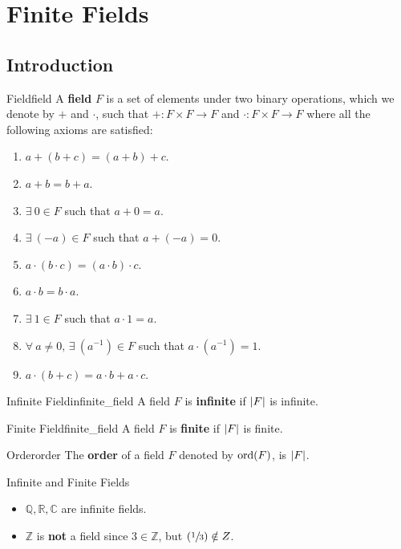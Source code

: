\chapter{Finite Fields}

\section{Introduction}
\begin{Definition}{Field}{field}
    A \textbf{field} $ F $ is a set of elements under two binary operations,
    which we denote by $ + $ and $ \cdot $, such that
    $ {+\colon F\times F\to F} $ and $ {\cdot\colon F\times F\to F} $
    where all the following axioms are satisfied:
    \begin{enumerate}[label=V\arabic*]
        \item $ a+(b+c)=(a+b)+c $.
        \item $ a+b=b+a $.
        \item $ \exists\ 0\in F $ such that $ a+0=a $.
        \item $ \exists\ (-a)\in F $ such that $ a+(-a)=0 $.
        \item $ a\cdot (b\cdot c)=(a\cdot b)\cdot c $.
        \item $ a\cdot b=b\cdot a $.
        \item $ \exists\ 1\in F $ such that $ a\cdot 1=a $.
        \item $ \forall\ a\neq 0,\,\exists\ (a^{-1})\in F $ such that
              $ a\cdot (a^{-1})=1 $.
        \item $ a\cdot (b+c)=a\cdot b+a\cdot c $.
    \end{enumerate}
\end{Definition}

\begin{Definition}{Infinite Field}{infinite_field}
    A field $ F $ is \textbf{infinite} if $ \lvert F\rvert $ is infinite.
\end{Definition}

\begin{Definition}{Finite Field}{finite_field}
    A field $ F $ is \textbf{finite} if $ \lvert F\rvert $ is finite.
\end{Definition}

\begin{Definition}{Order}{order}
    The \textbf{order} of a field $ F $ denoted by $ \operatorname{ord}(F) $, is $ \lvert F\rvert $.
\end{Definition}

\begin{Example}{Infinite and Finite Fields}{}
    \begin{itemize}
        \item $ \mathbb{Q},\mathbb{R},\mathbb{C} $ are infinite fields.
        \item $ \mathbb{Z} $ is \textbf{not} a field since $ 3\in\mathbb{Z} $, but
              $ (\sfrac{1}{3})\notin\relax{Z} $.
    \end{itemize}
\end{Example}

